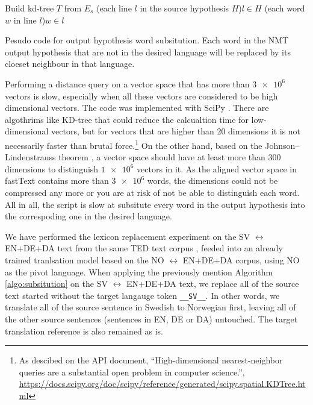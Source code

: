\documentclass[thesis,fonts=libertine]{cluu}
\begin{document}
\begin{algorithm}[h]
  \SetAlgoLined

  Build kd-tree $T$ from $E_s$
  \For(each line $l$ in the source hypothesis $H$){$l \in H$}{
    \For(each word $w$ in line $l$){$w \in l$}{
    }
  }
  \caption{Pesudo code for output hypothesis word subsitution. Each word in the NMT output hypothesis that are not in the desired language will be replaced by its cloeset neighbour in that language.}
  \label{algo:subsitution}
\end{algorithm}

Performing a distance query on a vector space that has more than $\num{3e6}$ vectors is slow, especially when all these vectors are considered to be high dimensional vectors. The code was implemented with SciPy \parencite{Virtanen:2019aa}. There are algothrims like KD-tree \parencite{Maneewongvatana:aa} that could reduce the calcualtion time for low-dimensional vectors, but for vectors that are higher than 20 dimensions it is not necessarily faster than brutal force.\footnote{As descibed on the API document, ``High-dimensional nearest-neighbor queries are a substantial open problem in computer science.'', \url{https://docs.scipy.org/doc/scipy/reference/generated/scipy.spatial.KDTree.html}} On the other hand, based on the Johnson–Lindenstrauss theorem \parencite{johnson1984extensions}, a vector space should have at least more than 300 dimensions to distinguish $\num{1e6}$ vectors in it. As the aligned vector space in fastText contains more than $\num{3e6}$ words, the dimensions could not be compressed any more or you are at risk of not be able to distinguish each word. All in all, the script is slow at subsitute every word in the output hypothesis into the correspoding one in the desired language.

We have performed the lexicon replacement experiment on the SV $\leftrightarrow$ EN+DE+DA text from the same TED text corpus \parencite{Qi:2018aa}, feeded into an already trained tranlsation model based on the NO $\leftrightarrow$ EN+DE+DA corpus, using NO as the pivot language. When applying the previously mention Algorithm \ref{algo:subsitution} on the SV $\leftrightarrow$ EN+DE+DA text, we replace all of the source text started without the target langauge token \verb|__SV__|. In other words, we translate all of the source sentence in Swedish to Norwegian first, leaving all of the other source sentences (sentences in EN, DE or DA) untouched. The target translation reference is also remained as is. 
\end{document}
